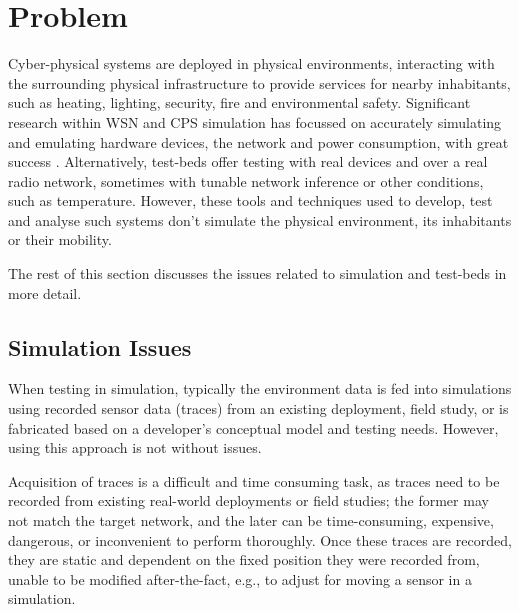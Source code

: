 \section{Problem} %
\label{sec:problem}
Cyber-physical systems are deployed in physical environments, interacting with the surrounding physical infrastructure to provide services for nearby inhabitants, such as heating, lighting, security, fire and environmental safety. Significant research within WSN and CPS simulation has focussed on accurately simulating and emulating hardware devices, the network and power consumption, with great success \cite{cooja, tossim}. Alternatively, test-beds offer testing with real devices and over a real radio network, sometimes with tunable network inference\cite{dependibilityTestbedChallenge} or other conditions, such as temperature\cite{TempLab}. However, these tools and techniques used to develop, test and analyse such systems don't simulate the physical environment, its inhabitants or their mobility. 

The rest of this section discusses the issues related to simulation and test-beds in more detail.

\subsection{Simulation Issues} %
\label{ssub:simulation_issues}

When testing in simulation, typically the environment data is fed into simulations using recorded sensor data (traces) from an existing deployment, field study\cite{bridge,Gaglione2018}, or is fabricated based on a developer's conceptual model and testing needs. However, using this approach is not without issues.

Acquisition of traces is a difficult and time consuming task, as traces need to be recorded from existing real-world deployments or field studies; the former may not match the target network, and the later can be time-consuming, expensive, dangerous, or inconvenient to perform thoroughly. Once these traces are recorded, they are static and dependent on the fixed position they were recorded from, unable to be modified after-the-fact, e.g., to adjust for moving a sensor in a simulation.

